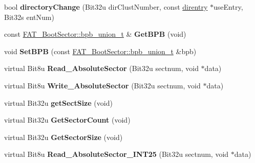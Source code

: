\begin{DoxyCompactItemize}
\item 
\hypertarget{classfatDrive_a8758f6fd418e47feb0783a0282e09fea}{bool {\bfseries directory\-Change} (Bit32u dir\-Clust\-Number, const \hyperlink{structdirentry}{direntry} $\ast$use\-Entry, Bit32s ent\-Num)}\label{classfatDrive_a8758f6fd418e47feb0783a0282e09fea}

\item 
\hypertarget{classfatDrive_a7c574d832eeb7ded4abbeee87a40000f}{const \hyperlink{unionFAT__BootSector_1_1bpb__union__t}{F\-A\-T\-\_\-\-Boot\-Sector\-::bpb\-\_\-union\-\_\-t} \& {\bfseries Get\-B\-P\-B} (void)}\label{classfatDrive_a7c574d832eeb7ded4abbeee87a40000f}

\item 
\hypertarget{classfatDrive_a187e82ad526afe9d1267c2451fa8cbb4}{void {\bfseries Set\-B\-P\-B} (const \hyperlink{unionFAT__BootSector_1_1bpb__union__t}{F\-A\-T\-\_\-\-Boot\-Sector\-::bpb\-\_\-union\-\_\-t} \&bpb)}\label{classfatDrive_a187e82ad526afe9d1267c2451fa8cbb4}

\item 
\hypertarget{classfatDrive_a0347726faa951ece86554389c1582365}{virtual Bit8u {\bfseries Read\-\_\-\-Absolute\-Sector} (Bit32u sectnum, void $\ast$data)}\label{classfatDrive_a0347726faa951ece86554389c1582365}

\item 
\hypertarget{classfatDrive_a0a2171e173e8718bc73b2a4ce7493aa6}{virtual Bit8u {\bfseries Write\-\_\-\-Absolute\-Sector} (Bit32u sectnum, void $\ast$data)}\label{classfatDrive_a0a2171e173e8718bc73b2a4ce7493aa6}

\item 
\hypertarget{classfatDrive_a8eec794d6977defe23a899c4ced8344d}{virtual Bit32u {\bfseries get\-Sect\-Size} (void)}\label{classfatDrive_a8eec794d6977defe23a899c4ced8344d}

\item 
\hypertarget{classfatDrive_a68587a6fcf5718c6af4c1d38b2ffffbc}{virtual Bit32u {\bfseries Get\-Sector\-Count} (void)}\label{classfatDrive_a68587a6fcf5718c6af4c1d38b2ffffbc}

\item 
\hypertarget{classfatDrive_ae5e0569a9aaf93936cd6e10d393ac458}{virtual Bit32u {\bfseries Get\-Sector\-Size} (void)}\label{classfatDrive_ae5e0569a9aaf93936cd6e10d393ac458}

\item 
\hypertarget{classfatDrive_a32675e2309c76b1433827bc84449c080}{virtual Bit8u {\bfseries Read\-\_\-\-Absolute\-Sector\-\_\-\-I\-N\-T25} (Bit32u sectnum, void $\ast$data)}\label{classfatDrive_a32675e2309c76b1433827bc84449c080}


\end{DoxyCompactItemize}

